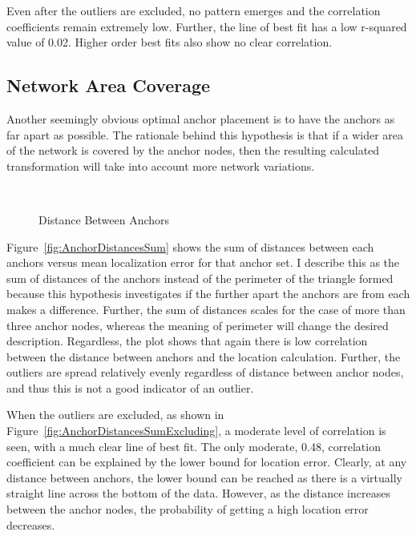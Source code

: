 Even after the outliers are excluded, no pattern emerges and the correlation coefficients remain extremely low.  Further, the line of best fit has a low r-squared value of 0.02.  Higher order best fits also show no clear correlation.

\subsection{Network Area Coverage}
\label{sec:anchorcoverage}
Another seemingly obvious optimal anchor placement is to have the anchors as far apart as possible.  The rationale behind this hypothesis is that if a wider area of the network is covered by the anchor nodes, then the resulting calculated transformation will take into account more network variations.

\begin{figure}
  \centering
		\\
	\caption{Distance Between Anchors}
    \label{fig:AnchorDistances}
\end{figure}

Figure~\ref{fig:AnchorDistancesSum} shows the sum of distances between each anchors versus mean localization error for that anchor set. I describe this as the sum of distances of the anchors instead of the perimeter of the triangle formed because this hypothesis investigates if the further apart the anchors are from each makes a difference. Further, the sum of distances scales for the case of more than three anchor nodes, whereas the meaning of perimeter will change the desired description. Regardless, the plot shows that again there is low correlation between the distance between anchors and the location calculation.  Further, the outliers are spread relatively evenly regardless of distance between anchor nodes, and thus this is not a good indicator of an outlier.

When the outliers are excluded, as shown in Figure~\ref{fig:AnchorDistancesSumExcluding}, a moderate level of correlation is seen, with a much clear line of best fit.  The only moderate, 0.48, correlation coefficient can be explained by the lower bound for location error.  Clearly, at any distance between anchors, the lower bound can be reached as there is a virtually straight line across the bottom of the data.  However, as the distance increases between the anchor nodes, the probability of getting a high location error decreases.

